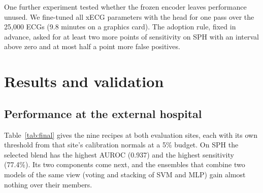 \documentclass[letterpaper,11pt]{article}
\begin{document}
One further experiment tested whether the frozen encoder leaves performance unused. We fine-tuned all xECG parameters with the head for one pass over the 25,000 ECGs (9.8 minutes on a graphics card). The adoption rule, fixed in advance, asked for at least two more points of sensitivity on SPH with an interval above zero and at most half a point more false positives.

\section{Results and validation}
\label{sec:results}

\subsection{Performance at the external hospital}

Table~\ref{tab:final} gives the nine recipes at both evaluation sites, each with its own threshold from that site's calibration normals at a 5\% budget. On SPH the selected blend has the highest AUROC (0.937) and the highest sensitivity (77.4\%). Its two components come next, and the ensembles that combine two models of the same view (voting and stacking of SVM and MLP) gain almost nothing over their members.
\end{document}
